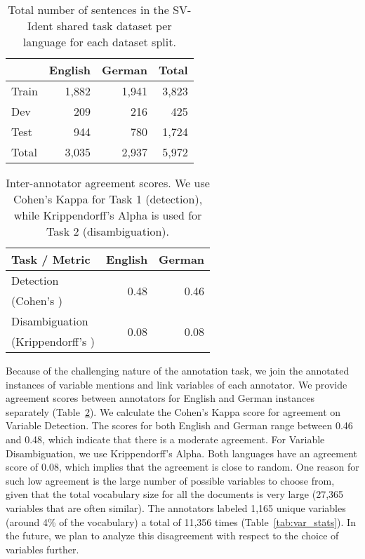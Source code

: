 \documentclass[11pt]{article}
\begin{document}
\begin{table}[]
    \centering
    \begin{tabular}{l|r|r|r}
         & English & German & Total \\
        \hline
        \hline
        Train & 1,882 & 1,941 & 3,823\\
        Dev & 209 & 216 & 425\\
        Test & 944 & 780 & 1,724\\
        \hline
        Total & 3,035 & 2,937 & 5,972 \\
        \hline
    \end{tabular}
    \caption{Total number of sentences in the SV-Ident shared task dataset per language for each dataset split.}
    \label{tab:data_stats}
\end{table}


\begin{table}[]
    \centering
    \begin{tabular}{p{3cm}|r|r}
        Task / Metric & English & German \\
        \hline
        \hline
        Detection & \multirow{ 2}{*}{0.48} & \multirow{ 2}{*}{0.46} \\
        (Cohen's ) &&\\
        \hline
        Disambiguation  & \multirow{ 2}{*}{0.08} & \multirow{ 2}{*}{0.08}\\
        (Krippendorff’s ) &&\\
        \hline
    \end{tabular}
    \caption{Inter-annotator agreement scores. We use Cohen's Kappa for Task 1 (detection), while Krippendorff's Alpha is used for Task 2 (disambiguation).}
    \label{tab:ann_aggrement}
\end{table}

Because of the challenging nature of the annotation task, we join the annotated instances of variable mentions and link variables of each annotator.
We provide agreement scores between annotators for English and German instances separately (Table~\ref{tab:ann_aggrement}).
We calculate the Cohen's Kappa score for agreement on Variable Detection.
The scores for both English and German range between 0.46 and 0.48, which indicate that there is a moderate agreement.
For Variable Disambiguation, we use Krippendorff's Alpha.
Both languages have an agreement score of 0.08, which implies that the agreement is close to random.
One reason for such low agreement is the large number of possible variables to choose from, given that the total vocabulary size for all the documents is very large (27,365 variables that are often similar).
The annotators labeled 1,165 unique variables (around 4\% of the vocabulary) a total of 11,356 times (Table~\ref{tab:var_stats}).
In the future, we plan to analyze this disagreement with respect to the choice of variables further.
\end{document}
